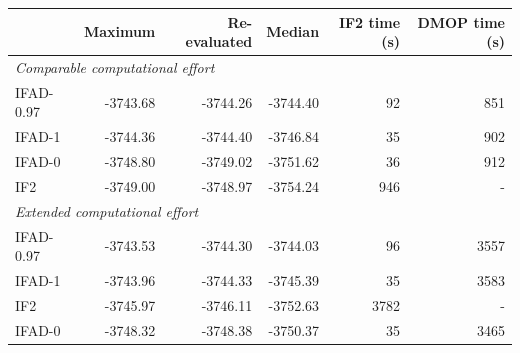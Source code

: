 \begin{tabular}{lrrrrr}
\toprule
 & Maximum & Re-evaluated & Median & IF2 time (s) & DMOP time (s) \\
\midrule
\multicolumn{6}{l}{\textit{Comparable computational effort}} \\
\midrule
IFAD-0.97 & -3743.68 & -3744.26 & -3744.40 & 92 & 851 \\
IFAD-1 & -3744.36 & -3744.40 & -3746.84 & 35 & 902 \\
IFAD-0 & -3748.80 & -3749.02 & -3751.62 & 36 & 912 \\
IF2 & -3749.00 & -3748.97 & -3754.24 & 946 & - \\
\midrule
\multicolumn{6}{l}{\textit{Extended computational effort}} \\
\midrule
IFAD-0.97 & -3743.53 & -3744.30 & -3744.03 & 96 & 3557 \\
IFAD-1 & -3743.96 & -3744.33 & -3745.39 & 35 & 3583 \\
IF2 & -3745.97 & -3746.11 & -3752.63 & 3782 & - \\
IFAD-0 & -3748.32 & -3748.38 & -3750.37 & 35 & 3465 \\
\bottomrule
\end{tabular}

